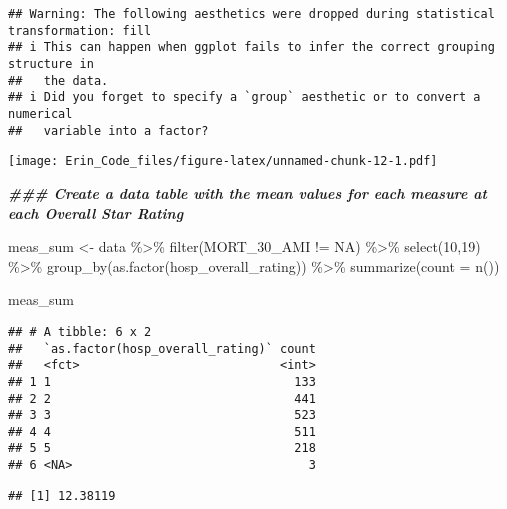 \documentclass[
]{article}
\newenvironment{Shaded}{\begin{snugshade}}{\end{snugshade}}
\newcommand{\AttributeTok}[1]{\textcolor[rgb]{0.77,0.63,0.00}{#1}}
\newcommand{\ConstantTok}[1]{\textcolor[rgb]{0.00,0.00,0.00}{#1}}
\newcommand{\DecValTok}[1]{\textcolor[rgb]{0.00,0.00,0.81}{#1}}
\newcommand{\DocumentationTok}[1]{\textcolor[rgb]{0.56,0.35,0.01}{\textbf{\textit{#1}}}}
\newcommand{\FunctionTok}[1]{\textcolor[rgb]{0.00,0.00,0.00}{#1}}
\newcommand{\NormalTok}[1]{#1}
\newcommand{\OtherTok}[1]{\textcolor[rgb]{0.56,0.35,0.01}{#1}}
\newcommand{\SpecialCharTok}[1]{\textcolor[rgb]{0.00,0.00,0.00}{#1}}
\newcommand{\StringTok}[1]{\textcolor[rgb]{0.31,0.60,0.02}{#1}}
\begin{document}
\begin{verbatim}
## Warning: The following aesthetics were dropped during statistical transformation: fill
## i This can happen when ggplot fails to infer the correct grouping structure in
##   the data.
## i Did you forget to specify a `group` aesthetic or to convert a numerical
##   variable into a factor?
\end{verbatim}

\texttt{[image: Erin\_Code\_files/figure-latex/unnamed-chunk-12-1.pdf]}

\begin{Shaded}
\begin{Highlighting}[]
\DocumentationTok{\#\#\# Create a data table with the mean values for each measure at each Overall Star Rating}

\NormalTok{meas\_sum }\OtherTok{\textless{}{-}}\NormalTok{ data }\SpecialCharTok{\%\textgreater{}\%} \FunctionTok{filter}\NormalTok{(MORT\_30\_AMI }\SpecialCharTok{!=} \StringTok{\textquotesingle{}NA\textquotesingle{}}\NormalTok{) }\SpecialCharTok{\%\textgreater{}\%} \FunctionTok{select}\NormalTok{(}\DecValTok{10}\NormalTok{,}\DecValTok{19}\NormalTok{) }\SpecialCharTok{\%\textgreater{}\%}  \FunctionTok{group\_by}\NormalTok{(}\FunctionTok{as.factor}\NormalTok{(hosp\_overall\_rating)) }\SpecialCharTok{\%\textgreater{}\%} \FunctionTok{summarize}\NormalTok{(}\AttributeTok{count =} \FunctionTok{n}\NormalTok{())}

\NormalTok{meas\_sum}
\end{Highlighting}
\end{Shaded}

\begin{verbatim}
## # A tibble: 6 x 2
##   `as.factor(hosp_overall_rating)` count
##   <fct>                            <int>
## 1 1                                  133
## 2 2                                  441
## 3 3                                  523
## 4 4                                  511
## 5 5                                  218
## 6 <NA>                                 3
\end{verbatim}

\begin{Shaded}
\end{Shaded}

\begin{verbatim}
## [1] 12.38119
\end{verbatim}
\end{document}
